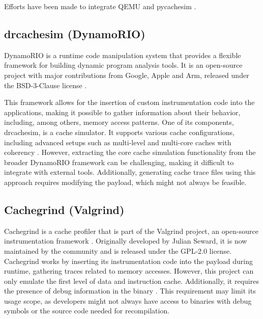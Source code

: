 \vspace{10px}
\noindent Efforts have been made to integrate QEMU and pycachesim \cite{pycachesimqemu}.

\subsection{drcachesim (DynamoRIO)}

DynamoRIO is a runtime code manipulation system that provides a flexible framework for building dynamic program analysis tools. It is an open-source project with major
contributions from Google, Apple and Arm, released under the BSD-3-Clause license \cite{dynamorio}.

This framework allows for the insertion of custom instrumentation code into the applications, making it possible to gather information about their behavior, including, among others,
memory access patterns. One of its components, drcachesim, is a cache simulator. It supports various cache configurations, including advanced setups such as multi-level and
multi-core caches with coherency \cite{drcachesim}. However, extracting the core cache simulation functionality from the broader DynamoRIO framework can be challenging, making it
difficult to integrate with external tools. Additionally, generating cache trace files using this approach requires modifying the payload, which might not always be feasible.

\subsection{Cachegrind (Valgrind)}

Cachegrind is a cache profiler that is part of the Valgrind project, an open-source instrumentation framework \cite{valgrind}. Originally developed by Julian Seward, it is now
maintained by the community \cite{valgrinddevelopers} and is released under the GPL-2.0 license.
Cachegrind works by inserting its instrumentation code into the payload during runtime, gathering traces related to memory accesses.
However, this project can only emulate the first level of data and instruction cache. Additionally, it requires the presence of debug information in the binary
\cite{cachegrinddocs}. This requirement may limit its usage scope, as developers might not always have access to binaries with debug symbols or the source code needed for
recompilation.

